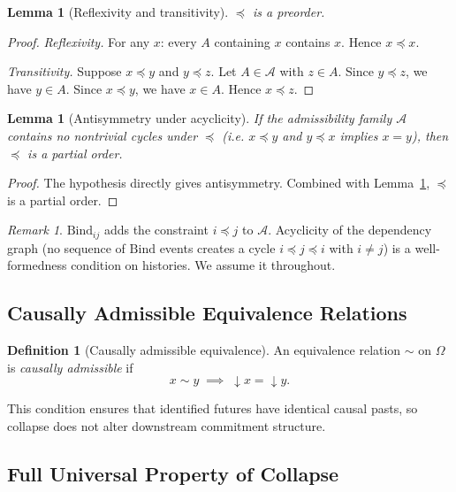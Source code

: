 \documentclass[12pt,a4paper]{article}
\newtheorem{lemma}[theorem]{Lemma}
\theoremstyle{definition}
\newtheorem{definition}[theorem]{Definition}
\theoremstyle{remark}
\newtheorem{remark}[theorem]{Remark}
\newcommand{\Bind}{\ensuremath{\mathrm{Bind}}}
\newcommand{\downset}[1]{\!\downarrow\!{#1}}
\begin{document}
\begin{lemma}[Reflexivity and transitivity]
\label{lem:preorder}
$\preceq$ is a preorder.
\end{lemma}

\begin{proof}
\textit{Reflexivity.} For any $x$: every $A$ containing $x$ contains $x$. Hence
$x\preceq x$.

\textit{Transitivity.} Suppose $x\preceq y$ and $y\preceq z$. Let $A\in\mathcal{A}$
with $z\in A$. Since $y\preceq z$, we have $y\in A$. Since $x\preceq y$, we have
$x\in A$. Hence $x\preceq z$.
\end{proof}

\begin{lemma}[Antisymmetry under acyclicity]
\label{lem:antisymmetry}
If the admissibility family $\mathcal{A}$ contains no nontrivial cycles under
$\preceq$ (i.e. $x\preceq y$ and $y\preceq x$ implies $x=y$), then $\preceq$ is a
partial order.
\end{lemma}

\begin{proof}
The hypothesis directly gives antisymmetry. Combined with Lemma~\ref{lem:preorder},
$\preceq$ is a partial order.
\end{proof}

\begin{remark}
$\Bind_{ij}$ adds the constraint $i\preceq j$ to $\mathcal{A}$. Acyclicity of the
dependency graph (no sequence of $\Bind$ events creates a cycle $i\preceq j\preceq i$
with $i\ne j$) is a well-formedness condition on histories. We assume it throughout.
\end{remark}

\subsection{Causally Admissible Equivalence Relations}

\begin{definition}[Causally admissible equivalence]
\label{def:causal-admissible}
An equivalence relation $\sim$ on $\Omega$ is \emph{causally admissible} if
\[
  x\sim y \;\implies\; \downset{x}=\downset{y}.
\]
\end{definition}

This condition ensures that identified futures have identical causal pasts, so
collapse does not alter downstream commitment structure.

\subsection{Full Universal Property of Collapse}
\end{document}
